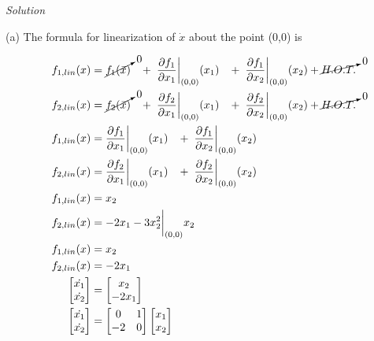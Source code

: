 \documentclass{article}
\begin{document}
  \vspace{3mm}
  
  \noindent \textit{Solution} \newline \newline

   (a)  The formula for linearization of $\dot{x}$ about the point (0,0) is

  \begin{align*}
    f_{1, lin}(x) &= \cancelto{0}{f_1(\bar{x})} \hspace{3.0mm} + \hspace{1.0mm}
    \frac{\partial f_1}{\partial x_1}\bigg|_{(0,0)}(x_1) \hspace{3.0mm} + \hspace{1.0mm}
    \frac{\partial f_1}{\partial x_2}\bigg|_{(0,0)}(x_2)+ \cancelto{0}{H.O.T.} \\ 
    f_{2, lin}(x) &= \cancelto{0}{f_2(\bar{x})} \hspace{3.0mm} + \hspace{1.0mm}
    \frac{\partial f_2}{\partial x_1}\bigg|_{(0,0)}(x_1) \hspace{3.0mm} + \hspace{1.0mm}
    \frac{\partial f_2}{\partial x_2}\bigg|_{(0,0)}(x_2)+ \cancelto{0}{H.O.T.} \\
    f_{1, lin}(x) &= \frac{\partial f_1}{\partial x_1}\bigg|_{(0,0)}(x_1) \hspace{3.0mm} + \hspace{1.0mm}
    \frac{\partial f_1}{\partial x_2}\bigg|_{(0,0)}(x_2) \\ 
    f_{2, lin}(x) &= \frac{\partial f_2}{\partial x_1}\bigg|_{(0,0)}(x_1) \hspace{3.0mm} + \hspace{1.0mm}
    \frac{\partial f_2}{\partial x_2}\bigg|_{(0,0)}(x_2) \\     
    f_{1, lin}(x) &= x_2 \\
    f_{2, lin}(x) &= -2x_1 - 3x_2^2\bigg|_{(0,0)}x_2 \\
    f_{1, lin}(x) &= x_2 \\
    f_{2, lin}(x) &= -2x_1 \\
    \begin{bmatrix}
      \dot{x_1} \\
      \dot{x_2}
    \end{bmatrix} &=
    \begin{bmatrix}
      x_2 \\
      -2x_1
    \end{bmatrix} \\
    \begin{bmatrix}
      \dot{x_1} \\
      \dot{x_2}
    \end{bmatrix} &=
    \begin{bmatrix}
     0 & 1 \\
     -2 & 0
    \end{bmatrix} 
    \begin{bmatrix}
      x_1 \\
      x_2
    \end{bmatrix} 
   \end{align*}
\end{document}
